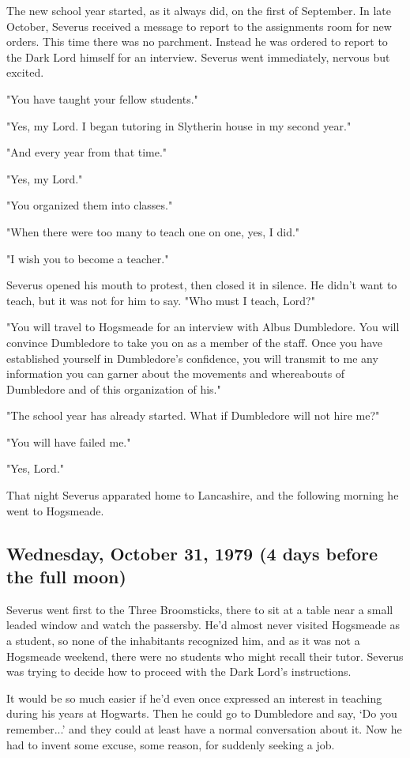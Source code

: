 The new school year started, as it always did, on the first of September. In late October, Severus received a message to report to the assignments room for new orders. This time there was no parchment. Instead he was ordered to report to the Dark Lord himself for an interview. Severus went immediately, nervous but excited.

"You have taught your fellow students."

"Yes, my Lord. I began tutoring in Slytherin house in my second year."

"And every year from that time."

"Yes, my Lord."

"You organized them into classes."

"When there were too many to teach one on one, yes, I did."

"I wish you to become a teacher."

Severus opened his mouth to protest, then closed it in silence. He didn't want to teach, but it was not for him to say. "Who must I teach, Lord?"

"You will travel to Hogsmeade for an interview with Albus Dumbledore. You will convince Dumbledore to take you on as a member of the staff. Once you have established yourself in Dumbledore's confidence, you will transmit to me any information you can garner about the movements and whereabouts of Dumbledore and of this organization of his."

"The school year has already started. What if Dumbledore will not hire me?"

"You will have failed me."

"Yes, Lord."

That night Severus apparated home to Lancashire, and the following morning he went to Hogsmeade.

\subsection{Wednesday, October 31, 1979 (4 days before the full moon)}

Severus went first to the Three Broomsticks, there to sit at a table near a small leaded window and watch the passersby. He'd almost never visited Hogsmeade as a student, so none of the inhabitants recognized him, and as it was not a Hogsmeade weekend, there were no students who might recall their tutor. Severus was trying to decide how to proceed with the Dark Lord's instructions.

It would be so much easier if he'd even once expressed an interest in teaching during his years at Hogwarts. Then he could go to Dumbledore and say, `Do you remember...' and they could at least have a normal conversation about it. Now he had to invent some excuse, some reason, for suddenly seeking a job.

